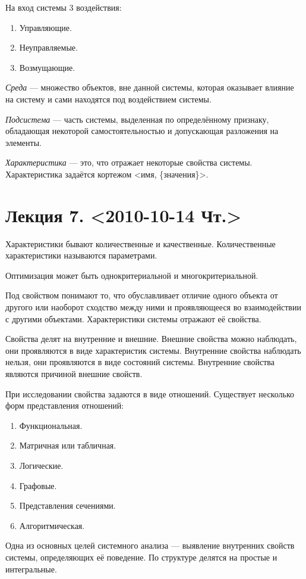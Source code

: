 \documentclass[12pt, russian, oneside, article]{ncc}
\begin{document}
На вход системы 3 воздействия:
\begin{enumerate}
\item Управляющие.
\item Неуправляемые.
\item Возмущающие.
\end{enumerate}

\emph{Среда} --- множество объектов, вне данной системы, которая оказывает влияние на систему и сами находятся под воздействием системы.

\emph{Подсистема} --- часть системы, выделенная по определённому признаку, обладающая некоторой самостоятельностью и допускающая разложения на элементы.

\emph{Характеристика} --- это, что отражает некоторые свойства системы.
Характеристика задаётся кортежом <имя, \{значения\}>.
\section{Лекция 7. <2010-10-14 Чт.>}
\label{sec-7}


Характеристики бывают количественные и качественные. Количественные характеристики называются параметрами.

Оптимизация может быть однокритериальной и многокритериальной.

Под свойством понимают то, что обуславливает отличие одного объекта от другого или наоборот сходство между ними и проявляющееся во взаимодействии с другими объектами. Характеристики системы отражают её свойства.

Свойства делят на внутренние и внешние. Внешние свойства можно наблюдать, они проявляются в виде характеристик системы. Внутренние свойства наблюдать нельзя, они проявляются в виде состояний системы. Внутренние свойства являются причиной внешние свойств.

При исследовании свойства задаются в виде отношений. Существует несколько форм представления отношений:
\begin{enumerate}
\item Функциональная.
\item Матричная или табличная.
\item Логические.
\item Графовые.
\item Представления сечениями.
\item Алгоритмическая.
\end{enumerate}

Одна из основных целей системного анализа --- выявление внутренних свойств системы, определяющих её поведение. По структуре делятся на простые и интегральные.
\end{document}
